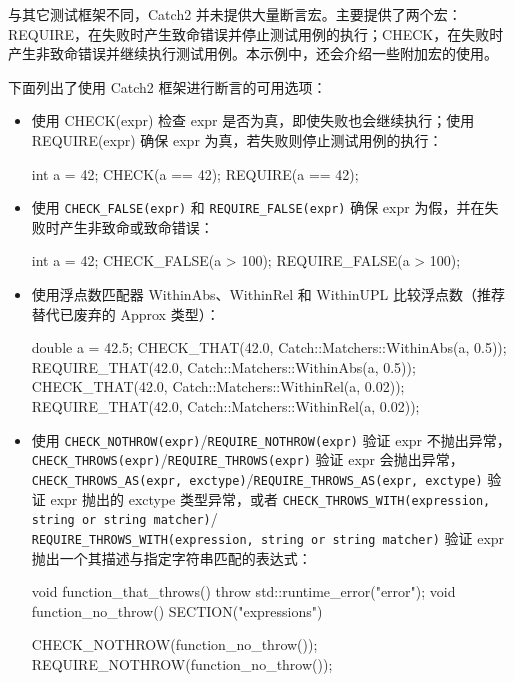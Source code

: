 
与其它测试框架不同，Catch2 并未提供大量断言宏。主要提供了两个宏：REQUIRE，在失败时产生致命错误并停止测试用例的执行；CHECK，在失败时产生非致命错误并继续执行测试用例。本示例中，还会介绍一些附加宏的使用。


下面列出了使用 Catch2 框架进行断言的可用选项：

\begin{itemize}
\item
使用 CHECK(expr) 检查 expr 是否为真，即使失败也会继续执行；使用 REQUIRE(expr) 确保 expr 为真，若失败则停止测试用例的执行：

\begin{cpp}
int a = 42;
CHECK(a == 42);
REQUIRE(a == 42);
\end{cpp}

\item
使用 \verb|CHECK_FALSE(expr)| 和 \verb|REQUIRE_FALSE(expr)| 确保 expr 为假，并在失败时产生非致命或致命错误：

\begin{cpp}
int a = 42;
CHECK_FALSE(a > 100);
REQUIRE_FALSE(a > 100);
\end{cpp}

\item
使用浮点数匹配器 WithinAbs、WithinRel 和 WithinUPL 比较浮点数（推荐替代已废弃的 Approx 类型）：

\begin{cpp}
double a = 42.5;
CHECK_THAT(42.0, Catch::Matchers::WithinAbs(a, 0.5));
REQUIRE_THAT(42.0, Catch::Matchers::WithinAbs(a, 0.5));
CHECK_THAT(42.0, Catch::Matchers::WithinRel(a, 0.02));
REQUIRE_THAT(42.0, Catch::Matchers::WithinRel(a, 0.02));
\end{cpp}

\item
使用 \verb|CHECK_NOTHROW(expr)|/\verb|REQUIRE_NOTHROW(expr)| 验证 expr 不抛出异常，\verb|CHECK_THROWS(expr)|/\verb|REQUIRE_THROWS(expr)| 验证 expr 会抛出异常，\verb|CHECK_THROWS_AS(expr, exctype)|/\verb|REQUIRE_THROWS_AS(expr, exctype)| 验证 expr 抛出的 exctype 类型异常，或者 \verb|CHECK_THROWS_WITH(expression, string or string matcher)|/\\\verb|REQUIRE_THROWS_WITH(expression, string or string matcher)| 验证 expr 抛出一个其描述与指定字符串匹配的表达式：

\begin{cpp}
void function_that_throws()
{
    throw std::runtime_error("error");
}
void function_no_throw()
{
}
SECTION("expressions")
{
    CHECK_NOTHROW(function_no_throw());
    REQUIRE_NOTHROW(function_no_throw());

}
\end{cpp}
\end{itemize}
